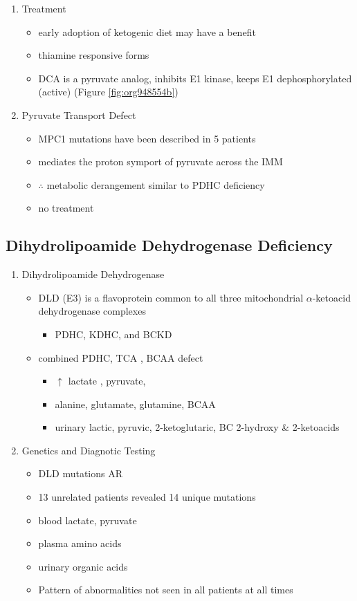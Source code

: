 \documentclass{scrartcl}
\begin{document}
\begin{enumerate}
\item Treatment
\label{sec:org2da448b}
\begin{itemize}
\item early adoption of ketogenic diet may have a benefit
\item thiamine responsive forms
\item DCA is a pyruvate analog, inhibits E1 kinase, keeps E1 dephosphorylated (active) (Figure \ref{fig:org948554b})
\end{itemize}

\item Pyruvate Transport Defect
\label{sec:orgc9a5782}
\begin{itemize}
\item MPC1 mutations have been described in 5 patients
\item mediates the proton symport of pyruvate across the IMM
\item \(\therefore\) metabolic derangement similar to PDHC deficiency
\item no treatment
\end{itemize}
\end{enumerate}

\subsection{Dihydrolipoamide Dehydrogenase Deficiency}
\label{sec:orgcd38fd9}
\begin{enumerate}
\item Dihydrolipoamide Dehydrogenase
\label{sec:org2628950}
\begin{itemize}
\item DLD (E3) is a flavoprotein common to all three mitochondrial
\(\alpha\)-ketoacid dehydrogenase complexes
\begin{itemize}
\item PDHC, KDHC, and BCKD
\end{itemize}
\item combined PDHC, TCA , BCAA defect
\begin{itemize}
\item \(\uparrow\) lactate , pyruvate,
\item alanine, glutamate, glutamine, BCAA
\item urinary lactic, pyruvic, 2-ketoglutaric, BC 2-hydroxy \& 2-ketoacids
\end{itemize}
\end{itemize}

\item Genetics and Diagnotic Testing
\label{sec:orgbbd6afd}
\begin{itemize}
\item DLD mutations AR
\item 13 unrelated patients revealed 14 unique mutations
\item blood lactate, pyruvate
\item plasma amino acids
\item urinary organic acids
\item Pattern of abnormalities not seen in all patients at all times
\end{itemize}
\end{enumerate}
\end{document}
